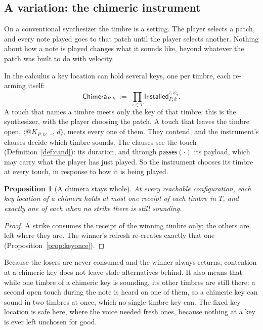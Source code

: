 \documentclass[11pt,a4paper]{article}
\makeatletter
\theoremstyle{plain}
\newtheorem{proposition}[theorem]{Proposition}
\theoremstyle{definition}
\theoremstyle{remark}
\newcommand{\nm}[3]{\langle @#1,\,#2,\,#3\rangle}
\newcommand{\atm}[1]{\mathsf{#1}}
\newcommand{\wild}{\_}
\makeatother
\begin{document}
\subsection{A variation: the chimeric instrument}\label{ssec:chimera}

On a conventional synthesizer the timbre is a setting. The player selects a
patch, and every note played goes to that patch until the player selects another.
Nothing about how a note is played changes what it sounds like, beyond whatever
the patch was built to do with velocity.

In the calculus a key location can hold several keys, one per timbre, each
re-arming itself:
\[
\mathsf{Chimera}_{P,k} \;:=\; \prod_{\tau \in T}
  \mathsf{Installed}_{P,k}^{\tau,\psi_\tau}.
\]
A touch that names a timbre meets only the key of that timbre: this is the
synthesizer, with the player choosing the patch. A touch that leaves the timbre
open, $\nm{K_{P,k}}{\wild}{d}$, meets every one of them. They contend, and the
instrument's clauses decide which timbre sounds. The clauses see the touch
(Definition~\ref{def:cand}): its duration, and through $\atm{passes}(\cdot)$
its payload, which may carry what the player has just played. So the instrument
chooses its timbre at every touch, in response to how it is being played.

\begin{proposition}[A chimera stays whole]\label{prop:chimera}
At every reachable configuration, each key location of a chimera holds at most
one receipt of each timbre in $T$, and exactly one of each when no strike there
is still sounding.
\end{proposition}
\begin{proof}
A strike consumes the receipt of the winning timbre only; the others are left
where they are. The winner's refresh re-creates exactly that one
(Proposition~\ref{prop:keyonce}).
\end{proof}

Because the losers are never consumed and the winner always returns, contention
at a chimeric key does not leave stale alternatives behind. It also means that
while one timbre of a chimeric key is sounding, its other timbres are still
there: a second open touch during the note is heard on one of them, so a chimeric
key can sound in two timbres at once, which no single-timbre key can. The fixed key
location is safe here, where the voice needed fresh ones, because nothing at a
key is ever left unchosen for good.
\end{document}
